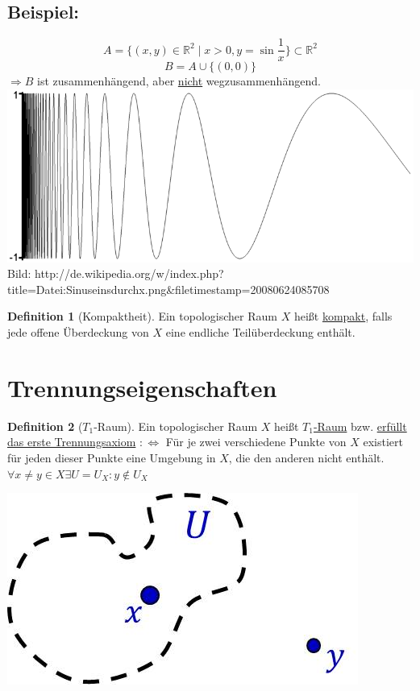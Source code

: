 \documentclass[a4paper,11pt,notitlepage]{report}
\theoremstyle{remark}
\theoremstyle{definition}
\newtheorem{definition}{Definition}[chapter]
\newcommand{\R}{{\ensuremath{\mathbb{R}}}}
\newenvironment{bsp}[1]
{
\setlength{\fboxsep}{10pt}
\subsection*{Beispiel: #1}
\begin{upshape}
}
{
\end{upshape}
}
\begin{document}
\begin{bsp}{}
	$$A=\{(x,y) \in \R^2 \mid x>0, y = \sin{\frac{1}{x}}\} \subset \R^2$$
	$$B=A \cup \{(0,0)\}$$
	$\Rightarrow B$ ist zusammenhängend, aber \underline{nicht} wegzusammenhängend.
	\newline
	\includegraphics[scale=0.4]{images/Sinuseinsdurchx.png}
	\newline
	\scriptsize{Bild: http://de.wikipedia.org/w/index.php?title=Datei:Sinuseinsdurchx.png\&filetimestamp=20080624085708}
\end{bsp}

\begin{definition}[Kompaktheit]
	Ein topologischer Raum $X$ heißt \underline{kompakt}, falls jede offene Überdeckung von $X$ eine endliche Teilüberdeckung enthält.
\end{definition}

\section{Trennungseigenschaften}
\begin{definition}[$T_1$-Raum]
Ein topologischer Raum $X$ heißt \underline{$T_1$-Raum} bzw. \underline{erfüllt das erste Trennungsaxiom} $:\Leftrightarrow$ Für je zwei verschiedene Punkte von $X$ existiert für jeden dieser Punkte eine Umgebung in $X$, die den anderen nicht enthält.
\newline
$\forall x \neq y \in X \exists U = U_X \colon y \notin U_X$ 
\end{definition}
\begin{center}
\includegraphics[scale=0.4]{images/T1.jpg}
\end{center}
\end{document}
